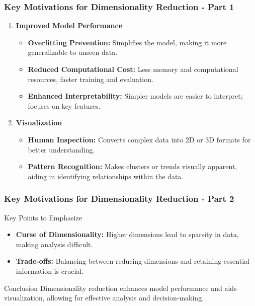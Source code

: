 \documentclass[aspectratio=169]{beamer}
\begin{document}
\begin{frame}[fragile]
    \frametitle{Key Motivations for Dimensionality Reduction - Part 1}
    \begin{enumerate}
        \item \textbf{Improved Model Performance}
        \begin{itemize}
            \item \textbf{Overfitting Prevention:} Simplifies the model, making it more generalizable to unseen data.
            \item \textbf{Reduced Computational Cost:} Less memory and computational resources, faster training and evaluation.
            \item \textbf{Enhanced Interpretability:} Simpler models are easier to interpret; focuses on key features.
        \end{itemize}
        \item \textbf{Visualization}
        \begin{itemize}
            \item \textbf{Human Inspection:} Converts complex data into 2D or 3D formats for better understanding.
            \item \textbf{Pattern Recognition:} Makes clusters or trends visually apparent, aiding in identifying relationships within the data.
        \end{itemize}
    \end{enumerate}
\end{frame}

\begin{frame}[fragile]
    \frametitle{Key Motivations for Dimensionality Reduction - Part 2}
    \begin{block}{Key Points to Emphasize}
        \begin{itemize}
            \item \textbf{Curse of Dimensionality:} Higher dimensions lead to sparsity in data, making analysis difficult.
            \item \textbf{Trade-offs:} Balancing between reducing dimensions and retaining essential information is crucial.
        \end{itemize}
    \end{block}
    
    \begin{block}{Conclusion}
        Dimensionality reduction enhances model performance and aids visualization, allowing for effective analysis and decision-making.
    \end{block}
\end{frame}
\end{document}
